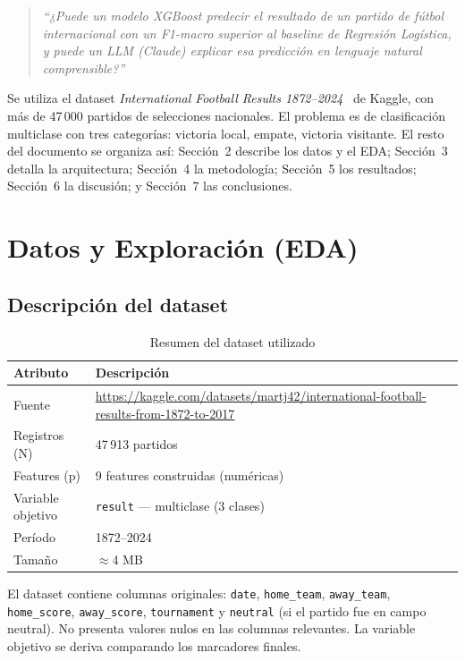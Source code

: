 \documentclass[10pt,twocolumn]{article}
\begin{document}
\begin{quote}
  \textit{``¿Puede un modelo XGBoost predecir el resultado de un
  partido de fútbol internacional con un F1-macro superior al baseline
  de Regresión Logística, y puede un LLM (Claude) explicar esa
  predicción en lenguaje natural comprensible?''}
\end{quote}

Se utiliza el dataset \textit{International Football Results
1872--2024}~\cite{martj42} de Kaggle, con más de 47\,000 partidos
de selecciones nacionales. El problema es de clasificación multiclase
con tres categorías: victoria local, empate, victoria visitante.
El resto del documento se organiza así: Sección~2 describe los
datos y el EDA; Sección~3 detalla la arquitectura; Sección~4 la
metodología; Sección~5 los resultados; Sección~6 la discusión;
y Sección~7 las conclusiones.

\section{Datos y Exploración (EDA)}

\subsection{Descripción del dataset}

\begin{table}[H]
\centering
\caption{Resumen del dataset utilizado}
\label{tab:dataset}
\begin{tabularx}{\columnwidth}{lX}
\toprule
\textbf{Atributo} & \textbf{Descripción} \\
\midrule
Fuente & \url{https://kaggle.com/datasets/martj42/international-football-results-from-1872-to-2017} \\
Registros (N) & 47\,913 partidos \\
Features (p) & 9 features construidas (numéricas) \\
Variable objetivo & \texttt{result} — multiclase (3 clases) \\
Período & 1872--2024 \\
Tamaño & $\approx$4 MB \\
\bottomrule
\end{tabularx}
\end{table}

El dataset contiene columnas originales: \texttt{date},
\texttt{home\_team}, \texttt{away\_team}, \texttt{home\_score},
\texttt{away\_score}, \texttt{tournament} y \texttt{neutral}
(si el partido fue en campo neutral). No presenta valores nulos
en las columnas relevantes. La variable objetivo se deriva
comparando los marcadores finales.
\end{document}

